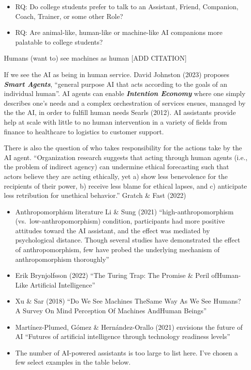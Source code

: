 \documentclass[
  letterpaper,
  DIV=11,
  numbers=noendperiod]{scrartcl}
\providecommand{\tightlist}{%
  \setlength{\itemsep}{0pt}\setlength{\parskip}{0pt}}\usepackage{longtable,booktabs,array}
\begin{document}
\begin{itemize}
\item
  RQ: Do college students prefer to talk to an Assistant, Friend,
  Companion, Coach, Trainer, or some other Role?
\item
  RQ: Are animal-like, human-like or machine-like AI companions more
  palatable to college students?
\end{itemize}

Humans (want to) see machines as human {[}ADD CITATION{]}

If we see the AI as being in human service. David Johnston (2023)
proposes \textbf{\emph{Smart Agents}}, ``general purpose AI that acts
according to the goals of an individual human''. AI agents can enable
\textbf{\emph{Intention Economy}} where one simply describes one's needs
and a complex orchestration of services ensues, managed by the the AI,
in order to fulfill human needs Searls (2012). AI assistants provide
help at scale with little to no human intervention in a variety of
fields from finance to healthcare to logistics to customer support.

There is also the question of who takes responsibility for the actions
take by the AI agent. ``Organization research suggests that acting
through human agents (i.e., the problem of indirect agency) can
undermine ethical forecasting such that actors believe they are acting
ethically, yet a) show less benevolence for the recipients of their
power, b) receive less blame for ethical lapses, and c) anticipate less
retribution for unethical behavior.'' Gratch \& Fast (2022)

\begin{itemize}
\tightlist
\item
  Anthropomorphism literature Li \& Sung (2021) ``high-anthropomorphism
  (vs.~low-anthropomorphism) condition, participants had more positive
  attitudes toward the AI assistant, and the effect was mediated by
  psychological distance. Though several studies have demonstrated the
  effect of anthropomorphism, few have probed the underlying mechanism
  of anthropomorphism thoroughly''
\item
  Erik Brynjolfsson (2022) ``The Turing Trap: The Promise \& Peril
  ofHuman-Like Artificial Intelligence''
\item
  Xu \& Sar (2018) ``Do We See Machines TheSame Way As We See Humans? A
  Survey On Mind Perception Of Machines AndHuman Beings''
\item
  Martínez-Plumed, Gómez \& Hernández-Orallo (2021) envisions the future
  of AI ``Futures of artificial intelligence through technology
  readiness levels''
\item
  The number of AI-powered assistants is too large to list here. I've
  chosen a few select examples in the table below.
\end{itemize}
\end{document}
